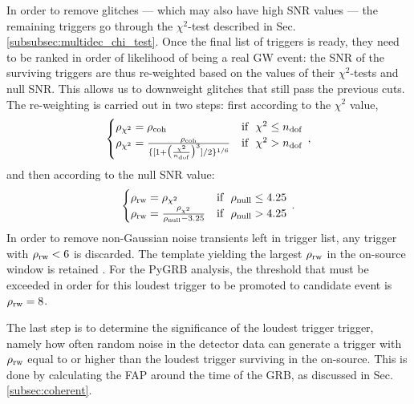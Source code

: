 \documentclass[binding=0.6cm, LaM]{sapthesis}
\begin{document}
	In order to remove glitches --- which may also have high SNR values --- the remaining triggers go through the $\chi^2$-test described in Sec.\,\ref{subsubsec:multidec_chi_test}.
	Once the final list of triggers is ready, they need to be ranked in order of likelihood of being a real GW event:
	the SNR of the surviving triggers are thus re-weighted based on the values of their $\chi^2$-tests and null SNR.
	This allows us to downweight glitches that still pass the previous cuts.
	The re-weighting is carried out in two steps: first according to the $\chi^2$ value,
        \begin{equation}
          \begin{cases}
            \rho_{\chi^2} =  \rho_{\rm coh} & \text{if}~~ \chi^2 \leq n_{\rm dof} \\
            \rho_{\chi^2} =  {{\rho_{\rm coh}}  \over {\{[1+ \big( {{\chi^2} \over {n_{\rm dof}}} \big)^3 ]/2\}^{1/6}}} & \text{if}~~ \chi^2 > n_{\rm dof}
          \end{cases}\,,
        \end{equation}
	and then according to the null SNR value:
        \begin{equation}
          \begin{cases}
            \rho_{\rm rw} = \rho_{\chi^2} & \text{if}~~ \rho_{\rm null} \leq 4.25\\
            \rho_{\rm rw} = {{ \rho_{\chi^2}}  \over {\rho_{\rm null} - 3.25}} & \text{if}~~ \rho_{\rm null} > 4.25
          \end{cases}\,.
        \end{equation}
	In order to remove non-Gaussian noise transients left in trigger list, 
	any trigger with $\rho_{\rm rw}<6$ is discarded.
	The template yielding the largest $\rho_{\rm rw}$ 
	in the on-source window is retained \cite{46}. 
	For the {\ttfamily PyGRB} analysis, the threshold that must be exceeded in order for this loudest trigger to be promoted to candidate event is $\rho_{\rm rw} = 8$.

	The last step is to determine the significance of the loudest trigger trigger,
	namely how often random noise in the detector data can generate a trigger with $\rho_{\rm rw}$ equal to or higher than the loudest trigger surviving in the on-source.
	This is done by calculating the FAP around the time of the GRB, as discussed in Sec.\,\ref{subsec:coherent}.
\end{document}

